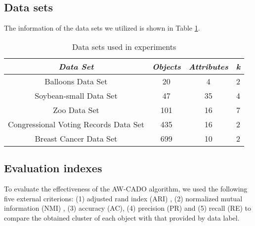 \documentclass[review]{elsarticle}
\begin{document}
\subsection{Data sets}
The information of the data sets we utilized is shown in Table \ref{tab:Information of data sets}.
\begin{table}[!th]\tabcolsep=0.065in
\centering
\caption{Data sets used in experiments}
\small
\label{tab:Information of data sets}
\begin{tabular}{cccc}
\hline
\emph{Data Set}&\emph{Objects}&\emph{Attributes}&\emph{k} \\
\hline
Balloons Data Set                       & 20  & 4   & 2 \\
Soybean-small Data Set                  & 47  & 35  & 4 \\
Zoo Data Set                            & 101 & 16  & 7 \\
Congressional Voting Records Data Set   & 435 & 16  & 2 \\
Breast Cancer Data Set                  & 699 & 10  & 2 \\
\hline
\end{tabular}
\end{table}

\subsection{Evaluation indexes}
To evaluate the effectiveness of the AW-CADO algorithm, we used the following five external criterions: (1) adjusted rand index (ARI) \cite{Liang2012The}, (2) normalized mutual information (NMI) \cite{strehl2003cluster}, (3) accuracy (AC), (4) precision (PR) and (5) recall (RE) to compare the obtained cluster of each object with that provided by data label.
\end{document}
